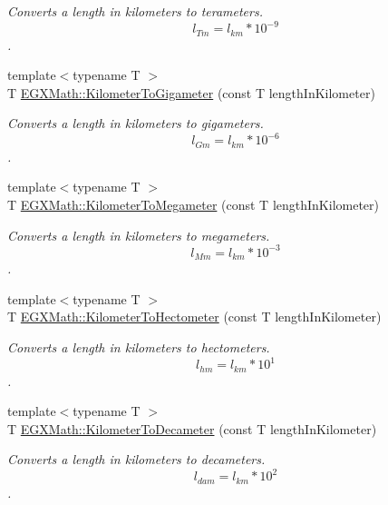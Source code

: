 \begin{DoxyCompactItemize}
\begin{DoxyCompactList}\small\item\em Converts a length in kilometers to terameters. \[ l_{Tm}=l_{km} * 10^{-9} \]. \end{DoxyCompactList}\item 
{\footnotesize template$<$typename T $>$ }\\T \mbox{\hyperlink{group___e_g_x_math-_conversions-_length_conversions-_s_i-_kilometer-_s_i_gafab6496ea68973d69b855d445c8a62a8}{E\+G\+X\+Math\+::\+Kilometer\+To\+Gigameter}} (const T length\+In\+Kilometer)
\begin{DoxyCompactList}\small\item\em Converts a length in kilometers to gigameters. \[ l_{Gm}=l_{km} * 10^{-6} \]. \end{DoxyCompactList}\item 
{\footnotesize template$<$typename T $>$ }\\T \mbox{\hyperlink{group___e_g_x_math-_conversions-_length_conversions-_s_i-_kilometer-_s_i_gacfeaef9cf345a9907addb7989eb11034}{E\+G\+X\+Math\+::\+Kilometer\+To\+Megameter}} (const T length\+In\+Kilometer)
\begin{DoxyCompactList}\small\item\em Converts a length in kilometers to megameters. \[ l_{Mm}=l_{km} * 10^{-3} \]. \end{DoxyCompactList}\item 
{\footnotesize template$<$typename T $>$ }\\T \mbox{\hyperlink{group___e_g_x_math-_conversions-_length_conversions-_s_i-_kilometer-_s_i_ga43aeeda4346af2ec10e749d076d38bc3}{E\+G\+X\+Math\+::\+Kilometer\+To\+Hectometer}} (const T length\+In\+Kilometer)
\begin{DoxyCompactList}\small\item\em Converts a length in kilometers to hectometers. \[ l_{hm}=l_{km} * 10^{1} \]. \end{DoxyCompactList}\item 
{\footnotesize template$<$typename T $>$ }\\T \mbox{\hyperlink{group___e_g_x_math-_conversions-_length_conversions-_s_i-_kilometer-_s_i_ga040acc3477237c471c0336e5b44d4654}{E\+G\+X\+Math\+::\+Kilometer\+To\+Decameter}} (const T length\+In\+Kilometer)
\begin{DoxyCompactList}\small\item\em Converts a length in kilometers to decameters. \[ l_{dam}=l_{km} * 10^{2} \]. \end{DoxyCompactList}\item 

\end{DoxyCompactItemize}
